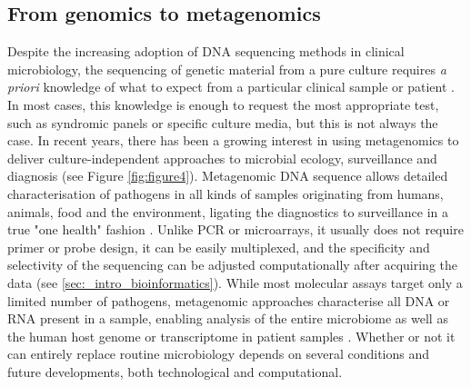 \subsection{From genomics to metagenomics} \label{ssec:_intro_metagenomics}

Despite the increasing adoption of \ac{DNA} sequencing methods in clinical microbiology, the sequencing of genetic material from a pure culture requires \textit{a priori} knowledge of what to expect from a particular clinical sample or patient \citep{schuele_future_2021}. 
In most cases, this knowledge is enough to request the most appropriate test, such as syndromic panels or specific culture media, but this is not always the case. 
In recent years, there has been a growing interest in using metagenomics to deliver culture-independent approaches to microbial ecology, surveillance and diagnosis (see Figure \ref{fig:figure4})\citep{loman_twenty_2015, loman_high-throughput_2012}.
Metagenomic \ac{DNA} sequence allows detailed characterisation of pathogens in all kinds of samples originating from humans, animals, food and the environment, ligating the diagnostics to surveillance in a true "one health" fashion \citep{rossen__2018}. 
Unlike \ac{PCR} or microarrays, it usually does not require primer or probe design, it can be easily multiplexed, and the specificity and selectivity of the sequencing can be adjusted computationally after acquiring the data \citep{dunne_next-generation_2012} (see \ref{sec:_intro_bioinformatics}).  
While most molecular assays target only a limited number of pathogens, metagenomic approaches characterise all \ac{DNA} or \ac{RNA} present in a sample, enabling analysis of the entire microbiome as well as the human host genome or transcriptome in patient samples \citep{chiu_clinical_2019}. 
Whether or not it can entirely replace routine microbiology depends on several conditions and future developments, both technological and computational.

